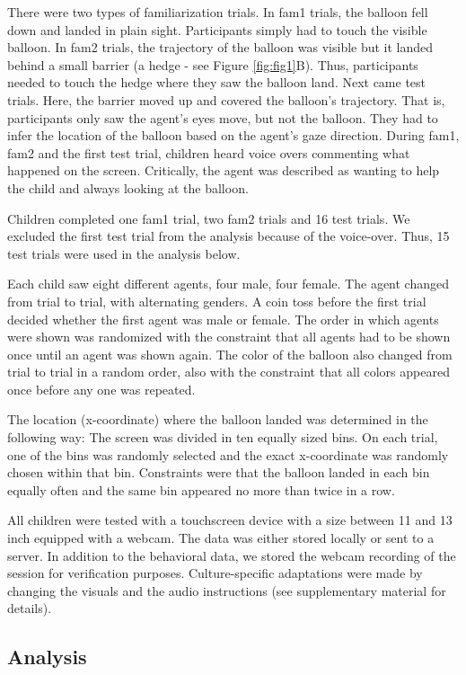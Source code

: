 \documentclass[
  man,floatsintext]{apa6}
\begin{document}
There were two types of familiarization trials. In fam1 trials, the balloon fell down and landed in plain sight. Participants simply had to touch the visible balloon. In fam2 trials, the trajectory of the balloon was visible but it landed behind a small barrier (a hedge - see Figure \ref{fig:fig1}B). Thus, participants needed to touch the hedge where they saw the balloon land. Next came test trials. Here, the barrier moved up and covered the balloon's trajectory. That is, participants only saw the agent's eyes move, but not the balloon. They had to infer the location of the balloon based on the agent's gaze direction. During fam1, fam2 and the first test trial, children heard voice overs commenting what happened on the screen. Critically, the agent was described as wanting to help the child and always looking at the balloon.

Children completed one fam1 trial, two fam2 trials and 16 test trials. We excluded the first test trial from the analysis because of the voice-over. Thus, 15 test trials were used in the analysis below.

Each child saw eight different agents, four male, four female. The agent changed from trial to trial, with alternating genders. A coin toss before the first trial decided whether the first agent was male or female. The order in which agents were shown was randomized with the constraint that all agents had to be shown once until an agent was shown again. The color of the balloon also changed from trial to trial in a random order, also with the constraint that all colors appeared once before any one was repeated.

The location (x-coordinate) where the balloon landed was determined in the following way: The screen was divided in ten equally sized bins. On each trial, one of the bins was randomly selected and the exact x-coordinate was randomly chosen within that bin. Constraints were that the balloon landed in each bin equally often and the same bin appeared no more than twice in a row.

All children were tested with a touchscreen device with a size between 11 and 13 inch equipped with a webcam. The data was either stored locally or sent to a server. In addition to the behavioral data, we stored the webcam recording of the session for verification purposes. Culture-specific adaptations were made by changing the visuals and the audio instructions (see supplementary material for details).

\hypertarget{analysis}{%
\subsection{Analysis}\label{analysis}}
\end{document}
